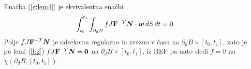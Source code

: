 \proof
	Enačba (\ref{e:lem4}) je ekvivalentna enačbi
	\[ \int_{t_0}^{t_1}\int_{\partial_d B}fJ\mathbf F^{-T}\boldsymbol N\cdot\boldsymbol w\,dS\,dt=0. \]
	Polje $fJ\mathbf F^{-T}\boldsymbol N$ je odsekoma regularno in zvezno v času na $\partial_d B\times[t_0,t_1]$,
	zato je po lemi (\ref{l:2}) $fJ\mathbf F^{-T}\boldsymbol N=\boldsymbol 0$ na $\partial_d B\times[t_0,t_1]$,
	iz REF pa nato sledi $\bar{f}=0$ na $\chi(\partial_d B, [t_0,t_1])$.
\endproof